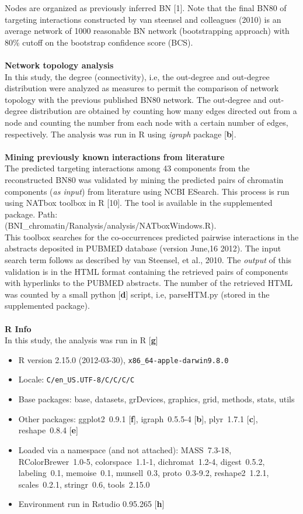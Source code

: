 \documentclass{bioinfo}
\begin{document}
\begin{methods}
Nodes are organized as previously inferred BN [1]. Note that the final BN80 of targeting interactions constructed by van steensel and colleagues (2010) is an average network of 1000 reasonable BN network (bootstrapping approach) with 80\% cutoff on the bootstrap confidence score (BCS).\\
 \\
 \textbf{Network topology analysis}\\
 In this study, the degree (connectivity), i.e, the out-degree and out-degree distribution were analyzed as measures to permit the comparison of network topology with the previous published BN80 network. The out-degree and out-degree distribution are obtained by counting how many edges directed out from a node and counting the number from each node with a certain number of edges, respectively. The analysis was run in R using \textit{igraph} package [\textbf{b}].\\
 \\
\textbf{Mining previously known interactions from literature}\\
The predicted targeting interactions among 43 components from the reconstructed BN80 was validated by mining the predicted pairs of chromatin components (\textit{as input}) from literature using NCBI ESearch. This process is run using NATbox toolbox in R [10]. The tool is available in the supplemented package. Path:\\(BNI\_chromatin/Ranalysis/analysis/NATboxWindows.R).\\ This toolbox searches for the co-occurrences predicted pairwise interactions in the abstracts deposited in PUBMED database (version June,16 2012). The input search term follows as described by van Steensel, et al., 2010. The \textit{output} of this validation is in the HTML format containing the retrieved pairs of components with hyperlinks to the PUBMED abstracts. The number of the retrieved HTML was counted by a small python [\textbf{d}] script, i.e, parseHTM.py (stored in the supplemented package).\\
\\
\textbf{R Info}\\
In this study, the analysis was run in R [\textbf{g}]
\begin{itemize}\raggedright
  \item R version 2.15.0 (2012-03-30), \verb|x86_64-apple-darwin9.8.0|
  \item Locale: \verb|C/en_US.UTF-8/C/C/C/C|
  \item Base packages: base, datasets, grDevices, graphics, grid, methods, stats, utils
  \item Other packages: ggplot2~0.9.1 [\textbf{f}], igraph~0.5.5-4 [\textbf{b}], plyr~1.7.1 [\textbf{c}], reshape~0.8.4 [\textbf{e}]
  \item Loaded via a namespace (and not attached): MASS~7.3-18, RColorBrewer~1.0-5,
    colorspace~1.1-1, dichromat~1.2-4, digest~0.5.2, labeling~0.1, memoise~0.1, munsell~0.3,
    proto~0.3-9.2, reshape2~1.2.1, scales~0.2.1, stringr~0.6, tools~2.15.0
 \item Environment run in Rstudio 0.95.265 [\textbf{h}]
 

\end{itemize}
\end{methods}
\end{document}
